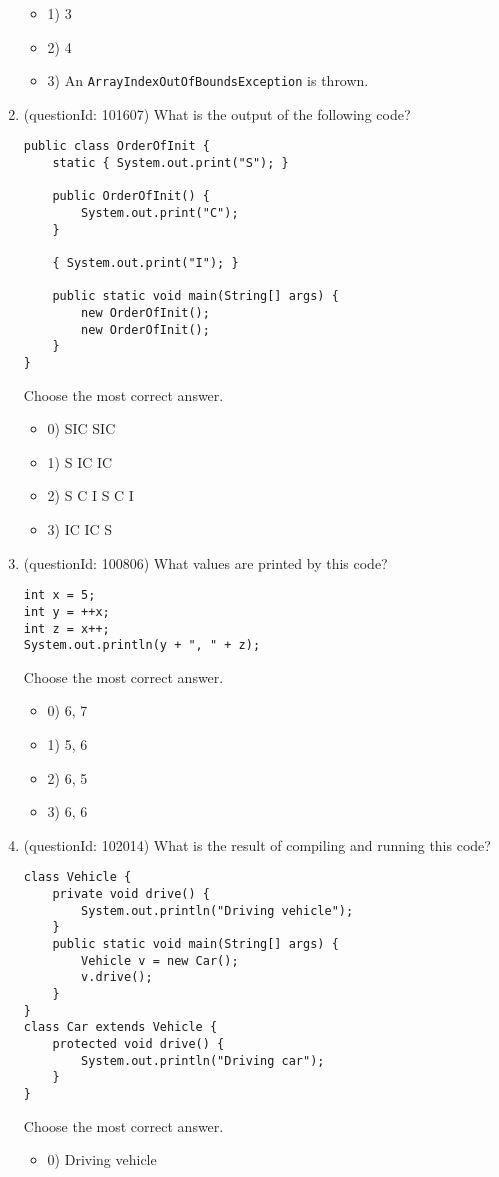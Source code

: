 \documentclass[12pt]{article}
\begin{document}
\begin{enumerate}[label=(\arabic*)]
\begin{itemize}
\item 1) 3

\item 2) 4

\item 3) An \verb|ArrayIndexOutOfBoundsException| is thrown.

\end{itemize}
\item (questionId: 101607) What is the output of the following code?\n\begin{verbatim}
public class OrderOfInit {
    static { System.out.print("S"); }

    public OrderOfInit() {
        System.out.print("C");
    }

    { System.out.print("I"); }

    public static void main(String[] args) {
        new OrderOfInit();
        new OrderOfInit();
    }
}
\end{verbatim}
Choose the most correct answer. 
\begin{itemize}
\item 0) SIC SIC

\item 1) S IC IC

\item 2) S C I S C I

\item 3) IC IC S

\end{itemize}
\item (questionId: 100806) What values are printed by this code?\n\begin{verbatim}
int x = 5;
int y = ++x;
int z = x++;
System.out.println(y + ", " + z);
\end{verbatim}
Choose the most correct answer. 
\begin{itemize}
\item 0) 6, 7

\item 1) 5, 6

\item 2) 6, 5

\item 3) 6, 6

\end{itemize}
\item (questionId: 102014) What is the result of compiling and running this code?
\begin{verbatim}
class Vehicle {
    private void drive() {
        System.out.println("Driving vehicle");
    }
    public static void main(String[] args) {
        Vehicle v = new Car();
        v.drive();
    }
}
class Car extends Vehicle {
    protected void drive() {
        System.out.println("Driving car");
    }
}
\end{verbatim}
Choose the most correct answer. 
\begin{itemize}
\item 0) Driving vehicle


\end{itemize}
\end{enumerate}
\end{document}
